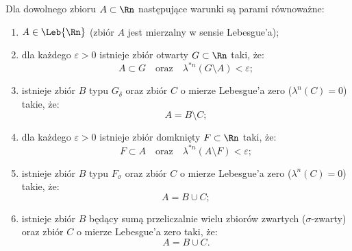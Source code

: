 \begin{tw}\label{tw:charakter_mierzalnosci}
    Dla dowolnego zbioru $A \subset \Rn$ następujące warunki są parami równoważne:
    \begin{enumerate}
        \item[(1)] $A \in \Leb{\Rn}$ (zbiór $A$ jest mierzalny w sensie Lebesgue'a);
        \item[(2)] dla każdego $\varepsilon > 0$ istnieje zbiór otwarty $G \subset \Rn$ taki, że:
              \begin{equation*}
                  A \subset G \quad \text{oraz} \quad \lambda^{*n}(G \setminus A) < \varepsilon;
              \end{equation*}
        \item[(3)] istnieje zbiór $B$ typu $G_\delta$ oraz zbiór $C$ o mierze Lebesgue'a zero ($\lambda^n(C) = 0$) takie, że:
              \begin{equation*}
                  A = B \setminus C;
              \end{equation*}
        \item[(4)] dla każdego $\varepsilon > 0$ istnieje zbiór domknięty $F \subset \Rn$ taki, że:
              \begin{equation*}
                  F \subset A \quad \text{oraz} \quad \lambda^{*n}(A \setminus F) < \varepsilon;
              \end{equation*}
        \item[(5)] istnieje zbiór $B$ typu $F_\sigma$ oraz zbiór $C$ o mierze Lebesgue'a zero ($\lambda^n(C) = 0$) takie, że:
              \begin{equation*}
                  A = B \cup C;
              \end{equation*}
        \item[(6)] istnieje zbiór $B$ będący sumą przeliczalnie wielu zbiorów zwartych ($\sigma$-zwarty) oraz zbiór $C$ o mierze Lebesgue'a zero taki, że:
              \begin{equation*}
                  A = B \cup C.
              \end{equation*}
    \end{enumerate}
\end{tw}

